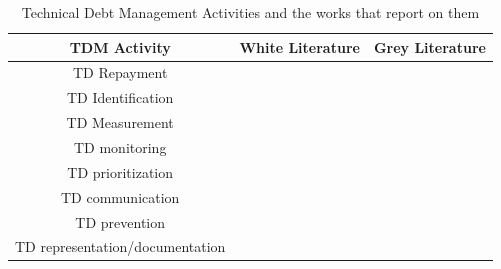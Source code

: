 \begin{table}[h!]
    
\centering
\begin{tabular}{|c|c|c|}
    \hline
    TDM Activity & White Literature & Grey Literature \\ \hline
    TD Repayment & ~\cite{10.1145/3084226.3084248, 10.1145/3387906.3388623} &  \\ \hline
    TD Identification & ~\cite{Klotins2018/3183519.3183539, CicoTradeoffs} & \\ \hline
    TD Measurement & & ~\cite{Qualityv77:online, Whopayso60:online}\\ \hline
    TD monitoring & ~\cite{Besker2018} & \\ \hline
 TD prioritization &  ~\cite{9820390} & ~\cite{techolut25:online, HowtoGet43:online}\\ \hline
TD communication & & ~\cite{FowlerBottlenecks} \\ \hline
TD prevention & ~\cite{SanchezGordon2016} & ~\cite{Creating18:online}\\ \hline
TD representation/documentation & ~\cite{Chicote:2017} & \\ \hline
    \end{tabular}

\caption{Technical Debt Management Activities and the works that report on them}
  \label{tab:TDMactivities}
\end{table}






